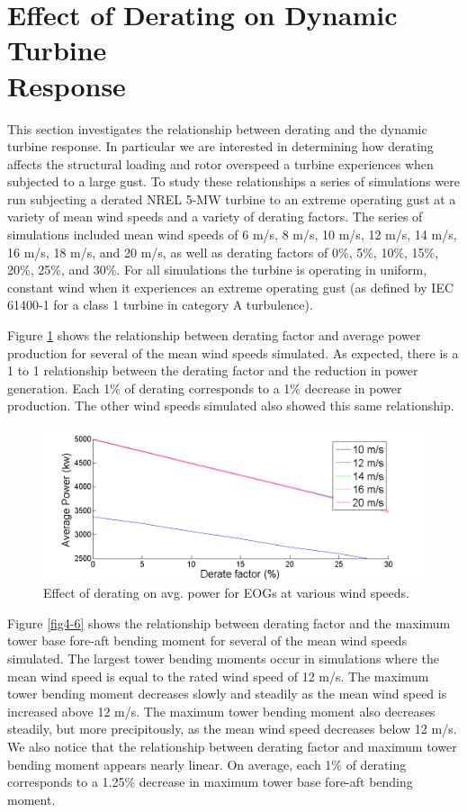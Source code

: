 \section{Effect of Derating on Dynamic Turbine \\
		Response} \label{section4-3}

This section investigates the relationship between derating and the dynamic turbine response. In particular we are interested in determining how derating affects the structural loading and rotor overspeed a turbine experiences when subjected to a large gust. To study these relationships a series of simulations were run subjecting a derated NREL 5-MW turbine to an extreme operating gust at a variety of mean wind speeds and a variety of derating factors. The series of simulations included mean wind speeds of 6 m/s, 8 m/s, 10 m/s, 12 m/s, 14 m/s, 16 m/s, 18 m/s, and 20 m/s, as well as derating factors of 0\%, 5\%, 10\%, 15\%, 20\%, 25\%, and 30\%. For all simulations the turbine is operating in uniform, constant wind when it experiences an extreme operating gust (as defined by IEC 61400-1 \cite{IEC2005} for a class 1 turbine in category A turbulence).

Figure \ref{fig4-5} shows the relationship between derating factor and average power production for several of the mean wind speeds simulated. As expected, there is a 1 to 1 relationship between the derating factor and the reduction in power generation. Each 1\% of derating corresponds to a 1\% decrease in power production. The other wind speeds simulated also showed this same relationship.

\begin{figure}[htb]
	\centering
		\includegraphics[width = \linewidth]{Figures/ch4Figures/fig4-5.png}
		
	\caption{Effect of derating on avg. power for EOGs at various wind speeds.}
	\label{fig4-5}
\end{figure}

Figure \ref{fig4-6} shows the relationship between derating factor and the maximum tower base fore-aft bending moment for several of the mean wind speeds simulated. The largest tower bending moments occur in simulations where the mean wind speed is equal to the rated wind speed of 12 m/s. The maximum tower bending moment decreases slowly and steadily as the mean wind speed is increased above 12 m/s. The maximum tower bending moment also decreases steadily, but more precipitously, as the mean wind speed decreases below 12 m/s. We also notice that the relationship between derating factor and maximum tower bending moment appears nearly linear. On average, each 1\% of derating corresponds to a 1.25\% decrease in maximum tower base fore-aft bending moment.


